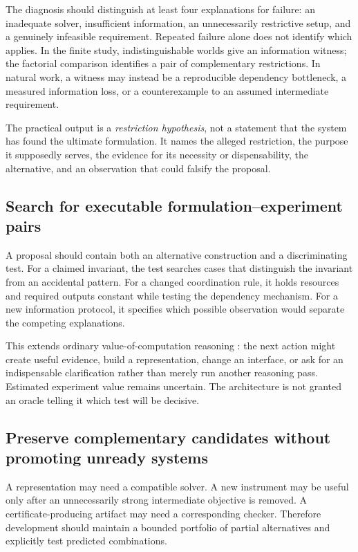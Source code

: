 \documentclass[11pt,letterpaper]{article}
\theoremstyle{remark}\newtheorem{remark}{Remark}[section]
\begin{document}
The diagnosis should distinguish at least four explanations for failure: an inadequate solver, insufficient information, an unnecessarily restrictive setup, and a genuinely infeasible requirement. Repeated failure alone does not identify which applies. In the finite study, indistinguishable worlds give an information witness; the factorial comparison identifies a pair of complementary restrictions. In natural work, a witness may instead be a reproducible dependency bottleneck, a measured information loss, or a counterexample to an assumed intermediate requirement.

The practical output is a \emph{restriction hypothesis}, not a statement that the system has found the ultimate formulation. It names the alleged restriction, the purpose it supposedly serves, the evidence for its necessity or dispensability, the alternative, and an observation that could falsify the proposal.

\subsection{Search for executable formulation--experiment pairs}
A proposal should contain both an alternative construction and a discriminating test. For a claimed invariant, the test searches cases that distinguish the invariant from an accidental pattern. For a changed coordination rule, it holds resources and required outputs constant while testing the dependency mechanism. For a new information protocol, it specifies which possible observation would separate the competing explanations.

This extends ordinary value-of-computation reasoning \citep{hay2012}: the next action might create useful evidence, build a representation, change an interface, or ask for an indispensable clarification rather than merely run another reasoning pass. Estimated experiment value remains uncertain. The architecture is not granted an oracle telling it which test will be decisive.

\subsection{Preserve complementary candidates without promoting unready systems}
A representation may need a compatible solver. A new instrument may be useful only after an unnecessarily strong intermediate objective is removed. A certificate-producing artifact may need a corresponding checker. Therefore development should maintain a bounded portfolio of partial alternatives and explicitly test predicted combinations.
\end{document}
